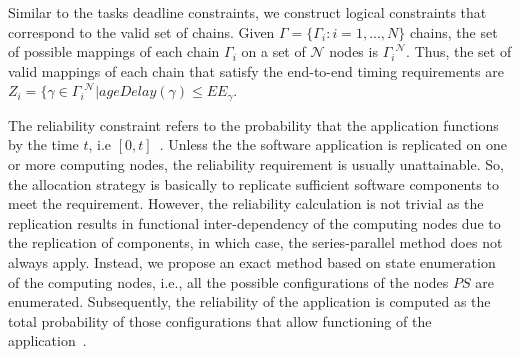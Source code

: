 Similar to the tasks deadline constraints, we construct logical constraints that correspond to the valid set of chains. Given $\Gamma =\{\Gamma_i:i=1,...,N\}$ chains, the set of possible mappings of each chain $\Gamma_i$ on a set of $\mathcal{N}$ nodes is ${\Gamma_i}^\mathcal{N}$. Thus, the set of valid mappings of each chain that satisfy the end-to-end timing requirements are $Z_i=\{\gamma\in {\Gamma_i}^\mathcal{N}| ageDelay(\gamma) \leq {EE}_\gamma$.

The reliability constraint refers to the probability that the application functions by the time $t$, i.e $[0,t]$~\cite{Goel1985SoftwareApplicability}. %
Unless the the software application is replicated on one or more computing nodes, the reliability requirement is usually unattainable. So, the allocation strategy is basically to replicate sufficient software components to meet the requirement. However, the reliability calculation is not trivial as the replication results in functional inter-dependency of the computing nodes due to the replication of components, in which case, the series-parallel method does not always apply. Instead, we propose an exact method based on state enumeration~\cite{Lucet1999ExactReliability} of the computing nodes, i.e., all the possible configurations of the nodes $PS$ are enumerated. Subsequently, the reliability of the application is computed as the total probability of those configurations that allow functioning of the application~\cite{Mahmud5222}.

